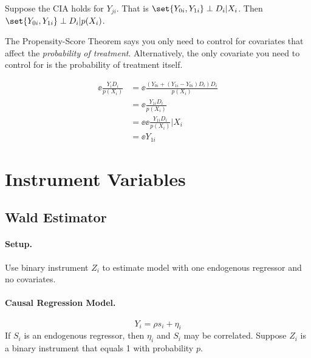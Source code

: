 \documentclass[11pt]{article}
\begin{document}
\begin{theorem}
	Suppose the CIA holds for $Y_{ji}$. That is $\set{Y_{0i}, Y_{1i}} \perp D_i | X_i$. Then $\set{Y_{0i}, Y_{1i}} \perp D_i | p(X_i)$.
\end{theorem}

\begin{interpretation}
	The Propensity-Score Theorem says you only need to control for covariates that affect the \emph{probability of treatment}. Alternatively, the only covariate you need to control for is the probability of treatment itself. 
\end{interpretation}

\begin{align*}
	\ee{\frac{Y_i D_i}{p(X_i)}} &= \ee{\frac{(Y_{0i} + (Y_{1i} - Y_{0i})D_i) D_i}{p(X_i)}} \\
	&= \ee{\frac{Y_{1i}D_i}{p(X_i)}} \\ 
	&= \ee{\ee{\frac{Y_{1i}D_i}{p(X_i)} \vert X_i}} \\
	&= \ee{Y_{1i}}
\end{align*}

\section{Instrument Variables}


\subsection{Wald Estimator}

\paragraph*{Setup.} Use binary instrument $Z_i$ to estimate model with one endogenous regressor and no covariates. 

\paragraph{Causal Regression Model.}
\begin{equation}
	Y_{i}=\rho s_{i}+\eta_{i}
\end{equation}
If $S_i$ is an endogenous regressor, then $\eta_i$ and $S_i$ may be correlated. Suppose $Z_i$ is a binary instrument that equals 1 with probability $p$. 
\end{document}
